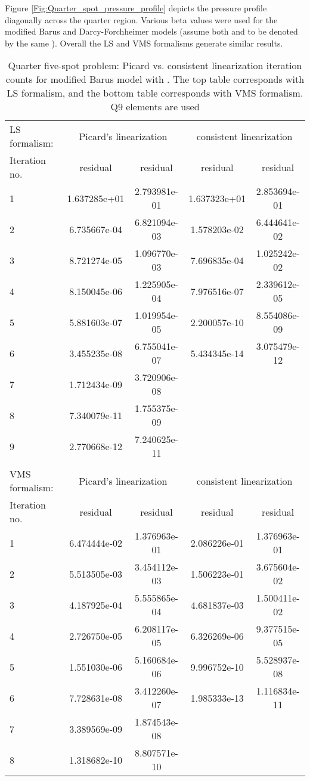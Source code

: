 \documentclass[11pt,reqno]{amsart}
\begin{document}
Figure \ref{Fig:Quarter_spot_pressure_profile} depicts the pressure profile diagonally across 
the quarter region. Various beta values were used for the modified Barus and Darcy-Forchheimer 
models (assume both  and  to be denoted by 
the same ). Overall the LS and VMS formalisms generate similar results.
\begin{table}[t!]
  \centering
  \caption{Quarter five-spot problem: Picard vs. consistent linearization iteration counts for modified Barus model with . The top
  table corresponds with LS formalism, and the bottom table corresponds with VMS formalism. Q9 elements are used}
  \begin{tabular}{lcc|cc}
      \hline
      LS formalism:&\multicolumn{2}{c|}{Picard's linearization}&\multicolumn{2}{c}{consistent linearization}\\
      Iteration no. & residual& residual& residual& residual\\   
      \hline
      1 & 1.637285e+01 & 2.793981e-01 & 1.637323e+01 & 2.853694e-01 \\
      2 & 6.735667e-04 & 6.821094e-03 & 1.578203e-02 & 6.444641e-02 \\
      3 & 8.721274e-05 & 1.096770e-03 & 7.696835e-04 & 1.025242e-02 \\
      4 & 8.150045e-06 & 1.225905e-04 & 7.976516e-07 & 2.339612e-05 \\
      5 & 5.881603e-07 & 1.019954e-05 & 2.200057e-10 & 8.554086e-09 \\
      6 & 3.455235e-08 & 6.755041e-07 & 5.434345e-14 & 3.075479e-12 \\
      7 & 1.712434e-09 & 3.720906e-08 & & \\
      8 & 7.340079e-11 & 1.755375e-09 & & \\
      9 & 2.770668e-12 & 7.240625e-11 & & \\
      \\
       \hline
      VMS formalism:&\multicolumn{2}{c|}{Picard's linearization}&\multicolumn{2}{c}{consistent linearization}\\
      Iteration no. & residual& residual& residual& residual\\   
      \hline
      1 & 6.474444e-02 & 1.376963e-01 & 2.086226e-01 & 1.376963e-01 \\
      2 & 5.513505e-03 & 3.454112e-03 & 1.506223e-01 & 3.675604e-02 \\
      3 & 4.187925e-04 & 5.555865e-04 & 4.681837e-03 & 1.500411e-02 \\
      4 & 2.726750e-05 & 6.208117e-05 & 6.326269e-06 & 9.377515e-05 \\
      5 & 1.551030e-06 & 5.160684e-06 & 9.996752e-10 & 5.528937e-08 \\
      6 & 7.728631e-08 & 3.412260e-07 & 1.985333e-13 & 1.116834e-11 \\
      7 & 3.389569e-09 & 1.874543e-08 & & \\
      8 & 1.318682e-10 & 8.807571e-10 & & \\
  \end{tabular}
  \label{Tab:five_spot_MB_iterations}
\end{table}
\end{document}
